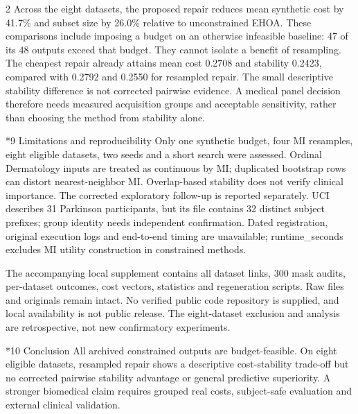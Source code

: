 \documentclass[10pt,a4paper]{article}
\makeatletter
\renewcommand{\section}{\@startsection{section}{1}{0pt}{5pt}{2pt}{\normalfont\normalsize\bfseries}}
\newcommand{\sect}[1]{\section*{#1}}
\makeatother
\begin{document}
\begin{multicols}{2}
Across the eight datasets, the proposed repair reduces mean synthetic cost by 41.7\% and subset size by 26.0\% relative to unconstrained EHOA. These comparisons include imposing a budget on an otherwise infeasible baseline: 47 of its 48 outputs exceed that budget. They cannot isolate a benefit of resampling. The cheapest repair already attains mean cost 0.2708 and stability 0.2423, compared with 0.2792 and 0.2550 for resampled repair. The small descriptive stability difference is not corrected pairwise evidence. A medical panel decision therefore needs measured acquisition groups and acceptable sensitivity, rather than choosing the method from stability alone.

\sect{9  Limitations and reproducibility}
Only one synthetic budget, four MI resamples, eight eligible datasets, two seeds and a short search were assessed. Ordinal Dermatology inputs are treated as continuous by MI; duplicated bootstrap rows can distort nearest-neighbor MI. Overlap-based stability does not verify clinical importance. The corrected exploratory follow-up is reported separately. UCI describes 31 Parkinson participants, but its file contains 32 distinct subject prefixes; group identity needs independent confirmation. Dated registration, original execution logs and end-to-end timing are unavailable; runtime\_seconds excludes MI utility construction in constrained methods.

The accompanying local supplement contains all dataset links, 300 mask audits, per-dataset outcomes, cost vectors, statistics and regeneration scripts. Raw files and originals remain intact. No verified public code repository is supplied, and local availability is not public release. The eight-dataset exclusion and analysis are retrospective, not new confirmatory experiments.

\sect{10  Conclusion}
All archived constrained outputs are budget-feasible. On eight eligible datasets, resampled repair shows a descriptive cost-stability trade-off but no corrected pairwise stability advantage or general predictive superiority. A stronger biomedical claim requires grouped real costs, subject-safe evaluation and external clinical validation.


\end{multicols}
\end{document}
